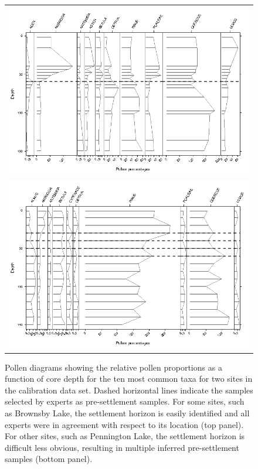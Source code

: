 

\begin{figure}
\centering
\begin{tabular}{c}
\includegraphics[width=6in]{figures/BROWNSBY_314.png} \\
\includegraphics[width=6in]{figures/PENNINGT_1884.png}
\end{tabular}
\caption{Pollen diagrams showing the relative pollen proportions as a
  function of core depth for the ten most common taxa for two sites in
  the calibration data set. Dashed horizontal lines indicate the
  samples selected by experts as pre-settlement samples. For some
  sites, such as Brownsby Lake, the settlement horizon is easily
  identified and all experts were in agreement with respect to its
  location (top panel). For other sites, such as Pennington Lake, the
  settlement horizon is difficult less obvious, resulting in multiple
  inferred pre-settlement samples (bottom panel).}
\label{fig:elicit}
\end{figure}


